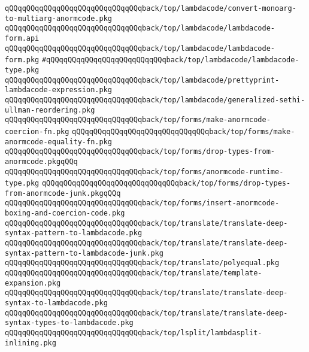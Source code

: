 \verb|qQQqqQQqqQQqqQQqqQQqqQQqqQQqqQQqback/top/lambdacode/convert-monoarg-to-multiarg-anormcode.pkg|\newline
\verb|qQQqqQQqqQQqqQQqqQQqqQQqqQQqqQQqback/top/lambdacode/lambdacode-form.api|\newline
\verb|qQQqqQQqqQQqqQQqqQQqqQQqqQQqqQQqback/top/lambdacode/lambdacode-form.pkg|\newline
\verb|#qQQqqQQqqQQqqQQqqQQqqQQqqQQqback/top/lambdacode/lambdacode-type.pkg|\newline
\verb|qQQqqQQqqQQqqQQqqQQqqQQqqQQqqQQqback/top/lambdacode/prettyprint-lambdacode-expression.pkg|\newline
\verb|qQQqqQQqqQQqqQQqqQQqqQQqqQQqqQQqback/top/lambdacode/generalized-sethi-ullman-reordering.pkg|\newline
\verb|qQQqqQQqqQQqqQQqqQQqqQQqqQQqqQQqback/top/forms/make-anormcode-coercion-fn.pkg|\newline
\verb|qQQqqQQqqQQqqQQqqQQqqQQqqQQqqQQqback/top/forms/make-anormcode-equality-fn.pkg|\newline
\verb|qQQqqQQqqQQqqQQqqQQqqQQqqQQqqQQqback/top/forms/drop-types-from-anormcode.pkgqQQq|\newline
\verb|qQQqqQQqqQQqqQQqqQQqqQQqqQQqqQQqback/top/forms/anormcode-runtime-type.pkg|\newline
\verb|qQQqqQQqqQQqqQQqqQQqqQQqqQQqqQQqback/top/forms/drop-types-from-anormcode-junk.pkgqQQq|\newline
\verb|qQQqqQQqqQQqqQQqqQQqqQQqqQQqqQQqback/top/forms/insert-anormcode-boxing-and-coercion-code.pkg|\newline
\verb|qQQqqQQqqQQqqQQqqQQqqQQqqQQqqQQqback/top/translate/translate-deep-syntax-pattern-to-lambdacode.pkg|\newline
\verb|qQQqqQQqqQQqqQQqqQQqqQQqqQQqqQQqback/top/translate/translate-deep-syntax-pattern-to-lambdacode-junk.pkg|\newline
\verb|qQQqqQQqqQQqqQQqqQQqqQQqqQQqqQQqback/top/translate/polyequal.pkg|\newline
\verb|qQQqqQQqqQQqqQQqqQQqqQQqqQQqqQQqback/top/translate/template-expansion.pkg|\newline
\verb|qQQqqQQqqQQqqQQqqQQqqQQqqQQqqQQqback/top/translate/translate-deep-syntax-to-lambdacode.pkg|\newline
\verb|qQQqqQQqqQQqqQQqqQQqqQQqqQQqqQQqback/top/translate/translate-deep-syntax-types-to-lambdacode.pkg|\newline
\verb|qQQqqQQqqQQqqQQqqQQqqQQqqQQqqQQqback/top/lsplit/lambdasplit-inlining.pkg|\newline
